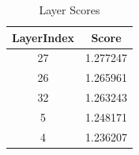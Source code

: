 
\begin{table}[h]
\centering
\begin{tabular}{|c|c|}
\hline
LayerIndex & Score \\
\hline
27 & 1.277247 \\
\hline
26 & 1.265961 \\
\hline
32 & 1.263243 \\
\hline
5 & 1.248171 \\
\hline
4 & 1.236207 \\
\hline
\end{tabular}
\caption{Layer Scores}
\end{table}
